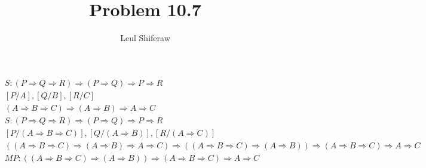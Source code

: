 \documentclass[a4paper]{article}
\title{Problem 10.7}
\author{Leul Shiferaw}
\begin{document}
\maketitle
\newpage
{}

\begin{align*}	
	&S: (P\Rightarrow Q \Rightarrow R)\Rightarrow (P\Rightarrow Q)\Rightarrow P\Rightarrow R\\
	&[P/A], [Q/B], [R/C]\\
	&(A\Rightarrow B \Rightarrow C)\Rightarrow (A\Rightarrow B)\Rightarrow A\Rightarrow C\\
	&S: (P\Rightarrow Q \Rightarrow R)\Rightarrow (P\Rightarrow Q)\Rightarrow P\Rightarrow R\\
	&[P/(A\Rightarrow B\Rightarrow C)], [Q/(A\Rightarrow B)], [R/(A\Rightarrow C)]\\
	&((A\Rightarrow B\Rightarrow C)\Rightarrow (A\Rightarrow B) \Rightarrow A\Rightarrow C)\Rightarrow ((A\Rightarrow B\Rightarrow C)\Rightarrow (A\Rightarrow B))\Rightarrow (A\Rightarrow B\Rightarrow C)\Rightarrow A\Rightarrow C\\ 
	&MP: ((A\Rightarrow B\Rightarrow C)\Rightarrow (A\Rightarrow B))\Rightarrow (A\Rightarrow B\Rightarrow C)\Rightarrow A\Rightarrow C\\ 
\end{align*} 
\end{document}
